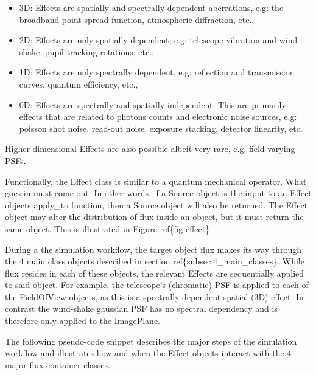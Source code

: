 \begin{itemize}
\item 3D: Effects are spatially and spectrally dependent aberrations, e.g: the broadband point spread function, atmospheric diffraction, etc.,

\item 2D: Effects are only spatially dependent, e.g: telescope vibration and wind shake, pupil tracking rotations, etc.,

\item 1D: Effects are only spectrally dependent, e.g: reflection and transmission curves, quantum efficiency, etc.,

\item 0D: Effects are spectrally and spatially independent. This are primarily effects that are related to photons counts and electronic noise sources, e.g: poisson shot noise, read-out noise, exposure stacking, detector linearity, etc.
\end{itemize}

Higher dimensional Effects are also possible albeit very rare, e.g. field varying PSFs.

Functionally, the Effect class is similar to a quantum mechanical operator.
What goes in must come out.
In other words, if a Source object is the input to an Effect objects \textquotedbl{}apply\_to\textquotedbl{} function, then a Source object will also be returned.
The Effect object may alter the distribution of flux inside an object, but it must return the same object.
This is illustrated in Figure ref\{fig-effect\}

During a the simulation workflow, the target object flux makes its way through the 4 main class objects described in section ref\{subsec:4\_main\_classes\}.
While flux resides in each of these objects, the relevant Effects are sequentially applied to said object.
For example, the telescope's (chromatic) PSF is applied to each of the FieldOfView objects, as this is a spectrally dependent spatial (3D) effect.
In contrast the wind-shake gaussian PSF has no spectral dependency and is therefore only applied to the ImagePlane.

The following pseudo-code snippet describes the major steps of the simulation workflow and illustrates how and when the Effect objects interact with the 4 major flux container classes.

